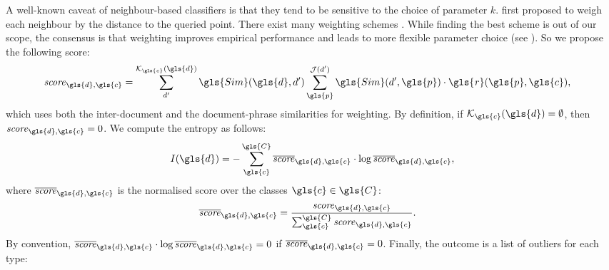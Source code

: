 A well-known caveat of neighbour-based classifiers is that they tend to be sensitive to the choice of parameter $k$.  
\cite{DBLP:journals/tsmc/Dudani76} first proposed to weigh each neighbour by the distance to the queried point. There exist many weighting schemes \cite{DBLP:conf/icpr/BicegoL16, DBLP:journals/eswa/GouMOZRY19}. %
While finding the best scheme is out of our scope, the consensus is that weighting improves empirical performance and leads to more flexible parameter choice (see \cite{epub1769}). So we propose the following score:     
\begin{align}
\label{eq:weightkjnn}
    \mathit{score}_{\gls{d},\gls{c}} &=  \sum_{d'}^{\mathcal{K}_{\gls{c}}(\gls{d})}  \gls{Sim}(\gls{d},d') \sum_{\gls{p}}^{\mathcal{J}(d')} \gls{Sim}(d',\gls{p}) \cdot \mathit{\gls{r}}(\gls{p},\gls{c}), 
\end{align}
which uses both the inter-document and the document-phrase similarities for weighting. 
By definition, if $\mathcal{K}_{\gls{c}}(\gls{d}) = \emptyset$, then $\mathit{score}_{\gls{d},\gls{c}} = 0$. 
We compute the entropy as follows: 
\begin{align}
    I(\gls{d}) = - \sum_{\gls{c}}^{\gls{C}} \overline{\mathit{score}}_{\gls{d},\gls{c}} \cdot \log  \overline{\mathit{score}}_{\gls{d},\gls{c}},
\end{align}
where $\overline{\mathit{score}}_{\gls{d},\gls{c}}$ is the normalised score over the classes $\gls{c} \in \gls{C}$:
\begin{align}
     \overline{\mathit{score}}_{\gls{d},\gls{c}} &= \frac{\mathit{score}_{\gls{d},\gls{c}}}{\sum_{\gls{c}}^{\gls{C}} \mathit{score}_{\gls{d},\gls{c}}}.
\end{align}
By convention, $\overline{\mathit{score}}_{\gls{d},\gls{c}} \cdot \log  \overline{\mathit{score}}_{\gls{d},\gls{c}} = 0$ if $\overline{\mathit{score}}_{\gls{d},\gls{c}} = 0$. 
Finally, the outcome is a list of outliers for each type: 
